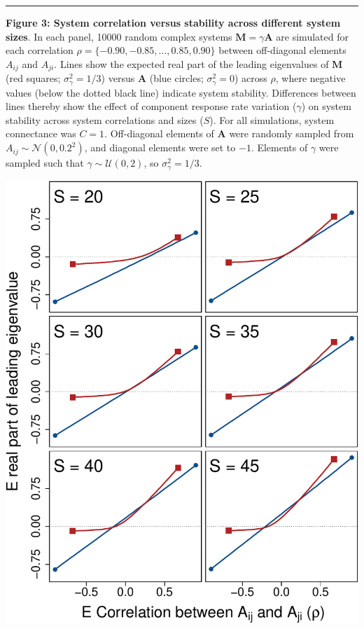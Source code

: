 \documentclass[]{article}
\begin{document}
\clearpage

\hrule
\vspace{2mm}

\textbf{Figure 3: System correlation versus stability across different
system sizes}. In each panel, 10000 random complex systems
\(\mathbf{M} = \gamma \mathbf{A}\) are simulated for each correlation
\(\rho = \{-0.90, -0.85, ..., 0.85, 0.90 \}\) between off-diagonal
elements \(A_{ij}\) and \(A_{ji}\). Lines show the expected real part of
the leading eigenvalues of \(\mathbf{M}\) (red squares;
\(\sigma^{2}_{\gamma} = 1/3\)) versus \(\mathbf{A}\) (blue circles;
\(\sigma^{2}_{\gamma} = 0\)) across \(\rho\), where negative values
(below the dotted black line) indicate system stability. Differences
between lines thereby show the effect of component response rate
variation (\(\gamma\)) on system stability across system correlations
and sizes (\(S\)). For all simulations, system connectance was
\(C = 1\). Off-diagonal elements of \(\textbf{A}\) were randomly sampled
from \(A_{ij} \sim \mathcal{N}(0, 0.2^{2})\), and diagonal elements were
set to \(-1\). Elements of \(\gamma\) were sampled such that
\(\gamma \sim \mathcal{U}(0, 2)\), so \(\sigma^{2}_{\gamma} = 1/3\).

\includegraphics{fig3.pdf}
\end{document}
